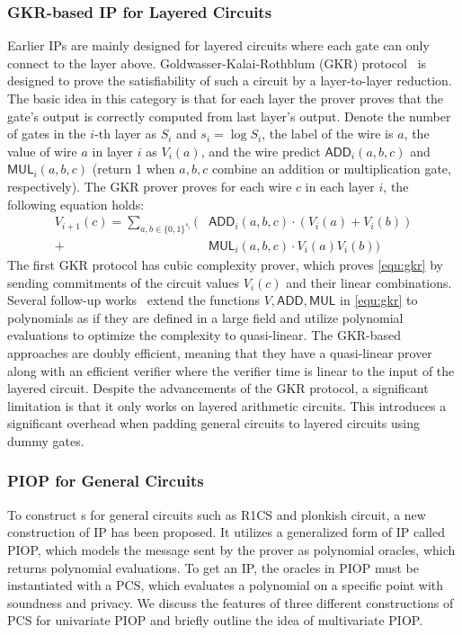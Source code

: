 \documentclass[letterpaper,twocolumn,10pt]{article}
\theoremstyle{definition}
\newcommand{\zk}{\text{zk-SNARK}\xspace}
\newcommand{\new}[1]{{#1}\xspace}
\begin{document}
\subsubsection{GKR-based IP for Layered Circuits}
\label{sec:GKR}
Earlier IPs are mainly designed for layered circuits where each gate can only connect to the layer above. Goldwasser-Kalai-Rothblum (GKR) protocol~\cite{goldwasser2015delegating} is designed to prove the satisfiability of such a circuit by a layer-to-layer reduction. 
\new{The basic idea in this category is that for each layer the prover proves that the gate's output is correctly computed from last layer's output. Denote the number of gates in the $i$-th layer as $S_{i}$ and $s_{i}=\log {S_{i}}$, the label of the wire is $a$, the value of wire $a$ in layer $i$ as $V_{i}(a)$, and the wire predict $\textsf{ADD}_{i}(a,b,c)$ and $\textsf{MUL}_{i}(a,b,c)$ (return 1 when $a,b,c$ combine an addition or multiplication gate, respectively). The GKR prover proves for each wire $c$ in each layer $i$, the following equation holds:
	\begin{equation}
		\label{equ:gkr}
		\begin{aligned}
			V_{i+1}(c)=\sum_{a,b\in \{0,1\}^{s_{i}}} (&\textsf{ADD}_{i}(a,b,c)\cdot (V_{i}(a)+V_{i}(b))\\
			+ \ &\textsf{MUL}_{i}(a,b,c)\cdot V_{i}(a)V_{i}(b))
		\end{aligned}
	\end{equation}
}
\new{\noindent The first GKR protocol has cubic complexity prover, which proves \autoref{equ:gkr} by sending commitments of the circuit values $V_{i}(c)$ and their linear combinations. Several follow-up works~\cite{wahby2018doubly,xie2019libra,zhang2020transparent,zhang2021doubly}
	extend the functions $V,\textsf{ADD},\textsf{MUL}$ in \autoref{equ:gkr} to polynomials as if they are defined in a large field and utilize polynomial evaluations to optimize the complexity to quasi-linear.}
The GKR-based approaches are doubly efficient, meaning that they have a quasi-linear prover along with an efficient verifier where the verifier time is linear to the input of the layered circuit. Despite the advancements of the GKR protocol, a significant limitation is that it only works on layered arithmetic circuits. This introduces a significant overhead when padding general circuits to layered circuits using dummy gates. 

\subsubsection{PIOP for General Circuits}
\label{sec:PIOP}
To construct {\zk}s for general circuits such as R1CS and plonkish circuit, a new construction of IP has been proposed. It utilizes a generalized form of IP called PIOP, which models the message sent by the prover as polynomial oracles, which returns polynomial evaluations. To get an IP, the oracles in PIOP must be instantiated with a PCS, which evaluates a polynomial on a specific point with soundness and privacy. We discuss the features of three different constructions of PCS for univariate PIOP and briefly outline the idea of multivariate PIOP.
\end{document}
